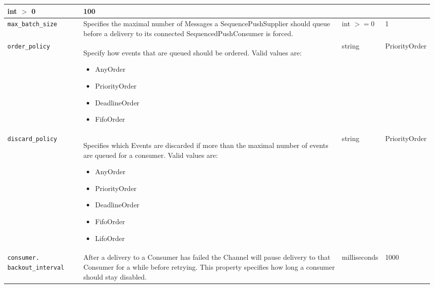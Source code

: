 \begin{small}
\begin{longtable}{|p{5cm}|p{7.5cm}|p{1.5cm}|p{1.5cm}|}
    int $>$ 0 & 100 \\ \hline

    \verb"max_batch_size" &

    Specifies the maximal number of Messages a SequencePushSupplier should
    queue before a delivery to its connected SequencedPushConsumer is
    forced. &

    int $>=0$ & 1 \\ \hline

    \verb"order_policy" &

    Specify how events that are queued should be ordered. Valid values
    are:
    \begin{itemize}
    \item AnyOrder

    \item PriorityOrder

    \item DeadlineOrder

    \item FifoOrder
    \end{itemize} &

    string & Priority\-Order \\ \hline

    \verb"discard_policy" &

    Specifies which Events are discarded if more than the
    maximal number of events are queued for a consumer.
    Valid values are:
    \begin{itemize}
    \item AnyOrder

    \item PriorityOrder

    \item DeadlineOrder

    \item FifoOrder

    \item LifoOrder
    \end{itemize} &

    string & Priority\-Order \\ \hline

    \verb"consumer."
    \verb"backout_interval" &

    After a delivery to a Consumer has failed the Channel will pause
    delivery to that Consumer for a while before retrying. This property
    specifies how long a consumer should stay disabled. &

    milli\-seconds & 1000 \\ \hline


\end{longtable}
\end{small}
